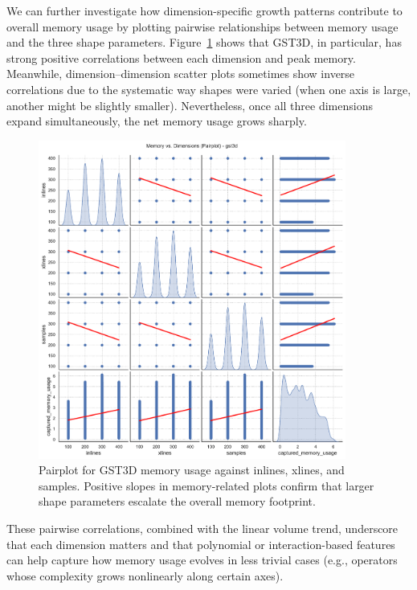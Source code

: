 We can further investigate how dimension-specific growth patterns contribute to overall memory usage by plotting pairwise relationships between memory usage and the three shape parameters.
Figure~\ref{fig:memory_vs_dimensions_pairplot_gst3d} shows that \ac{GST3D}, in particular, has strong positive correlations between each dimension and peak memory.
Meanwhile, dimension--dimension scatter plots sometimes show inverse correlations due to the systematic way shapes were varied (when one axis is large, another might be slightly smaller).
Nevertheless, once all three dimensions expand simultaneously, the net memory usage grows sharply.


\begin{figure}[htbp]
    \centering
    \includegraphics[width=0.9\textwidth]{assets/images/05/memory_vs_dimensions_pairplot_gst3d}
    \caption{Pairplot for \ac{GST3D} memory usage against inlines, xlines, and samples. Positive slopes in memory-related plots confirm that larger shape parameters escalate the overall memory footprint.}
    \label{fig:memory_vs_dimensions_pairplot_gst3d}
\end{figure}

These pairwise correlations, combined with the linear volume trend, underscore that each dimension matters and that polynomial or interaction-based features can help capture how memory usage evolves in less trivial cases (e.g., operators whose complexity grows nonlinearly along certain axes).

